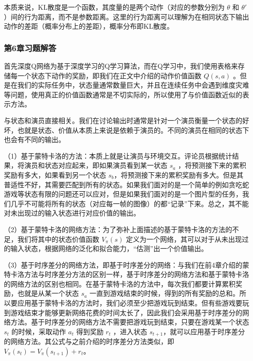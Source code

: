 
本质来说，KL散度是一个函数，其度量的是两个动作（对应的参数分别为 $\theta$ 和 $\theta'$ ）间的行为距离，而不是参数距离。这里的行为距离可以理解为在相同状态下输出动作的差距（概率分布上的差距），概率分布即KL散度。 



\subsubsection*{第6章习题解答}


首先深度Q网络为基于深度学习的Q学习算法，而在Q学习中，我们使用表格来存储每一个状态下动作的奖励，即我们在正文中介绍的动作价值函数 $Q(s,a)$ 。但是在我们的实际任务中，状态量通常数量巨大，并且在连续任务中会遇到维度灾难等问题，使用真正的价值函数通常是不切实际的，所以使用了与价值函数近似的表示方法。


与状态和演员直接相关。我们在讨论输出时通常是针对一个演员衡量一个状态的好坏，也就是状态、价值从本质上来说是依赖于演员的。不同的演员在相同的状态下也会有不同的输出。


（1）基于蒙特卡洛的方法：本质上就是让演员与环境交互。评论员根据统计结果，将演员和状态对应起来，即如果演员看到某一状态 $s_a$ ，将预测接下来的累积奖励有多大，如果看到另一个状态 $s_b$，将预测接下来的累积奖励有多大。但是其普适性不好，其需要匹配到所有的状态。如果我们面对的是一个简单的例如贪吃蛇游戏等状态有限的问题还可以应对，但是如果我们面对的是一个图片型的任务，我们几乎不可能将所有的状态（对应每一帧的图像）的都“记录”下来。总之，其不能对未出现过的输入状态进行对应价值的输出。

（2）基于蒙特卡洛的网络方法：为了弥补上面描述的基于蒙特卡洛的方法的不足，我们将其中的状态价值函数 $V_{\pi}(s)$ 定义为一个网络，其可以对于从未出现过的输入状态，根据网络的泛化和拟合能力，“估测”出一个价值输出。

（3）基于时序差分的网络方法，即基于时序差分的网络：与我们在前4章介绍的蒙特卡洛方法与时序差分方法的区别一样，基于时序差分的网络方法和基于蒙特卡洛的网络方法的区别也相同。在基于蒙特卡洛的方法中，每次我们都要计算累积奖励，也就是从某一个状态 $s_a$ 一直到游戏结束的时候，得到的所有奖励的总和。所以要应用基于蒙特卡洛的方法时，我们必须至少把游戏玩到结束。但有些游戏要玩到游戏结束才能够更新网络花费的时间太长了，因此我们会采用基于时序差分的网络方法。基于时序差分的网络方法不需要把游戏玩到结束，只要在游戏某一个状态 $s_t$ 的时候，采取动作 $a_t$ 得到奖励 $r_t$ ，进入状态 $s_{t+1}$，就可以应用基于时序差分的网络方法。其公式与之前介绍的时序差分方法类似，即 $V_{\pi}\left(s_{t}\right)=V_{\pi}\left(s_{t+1}\right)+r_{t}$。

